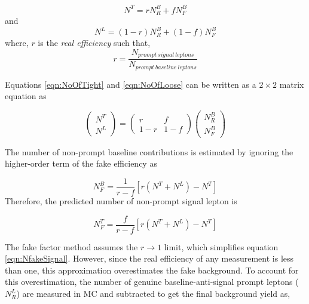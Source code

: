 \begin{equation}
N^{T} = rN^{B}_{R}+fN^{B}_{F}
\label{eqn:NoOfTight}
\end{equation}
and 
\begin{equation}
N^{L} = (1-r)N^{B}_{R} + (1-f)N^{B}_{F}
\label{eqn:NoOfLoose}
\end{equation}
where, $r$ is the \textit{real efficiency} such that, 
\begin{equation} 
    r=\frac{N_{prompt~signal~leptons}}{N_{prompt~baseline~leptons}}
\end{equation}

Equations \ref{eqn:NoOfTight} and \ref{eqn:NoOfLoose} can be written as a $2 \times 2$ matrix equation as

\begin{equation}
    \begin{pmatrix} N^{T} \\ N^{L} \end{pmatrix} =  \begin{pmatrix} r & f \\ 1-r & 1-f \end{pmatrix} \begin{pmatrix} N^{B}_{R} \\ N^{B}_{F}\end{pmatrix}
    \label{eqn:RealFakeLepton}
\end{equation}

The number of non-prompt baseline contributions is estimated by ignoring the higher-order term of the fake efficiency as

\begin{equation}
    N_{F}^{B} =  \frac{1}{r-f}[r(N^{T}+N^{L})-N^{T}]
    \label{eqn:NfakeBaseline}
\end{equation}
Therefore, the predicted number of non-prompt signal lepton is 

\begin{equation}
    N_{F}^{T} =  \frac{f}{r-f}[r(N^{T}+N^{L})-N^{T}]
\label{eqn:NfakeSignal}
\end{equation}

The fake factor method assumes the $r\rightarrow 1$ limit, which simplifies equation \ref{eqn:NfakeSignal}. However, since the real efficiency of any measurement is less than one, this approximation overestimates the fake background. To account for this overestimation, the number of genuine baseline-anti-signal prompt leptons ($N^{L}_{R}$) are measured in MC and subtracted to get the final background yield as, 


